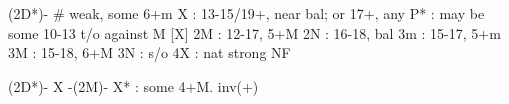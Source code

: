 (2D*)- # weak, some 6+m
X  : 13-15/19+, near bal; or 17+, any
P* : may be some 10-13 t/o against M [X]
2M : 12-17, 5+M
2N : 16-18, bal
3m : 15-17, 5+m
3M : 15-18, 6+M
3N : s/o
4X : nat strong NF

(2D*)- X -(2M)- 
X* : some 4+M. inv(+)